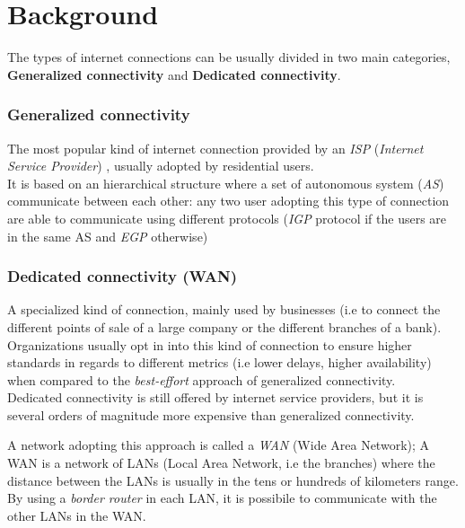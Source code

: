 \section{Background}

The types of internet connections can be usually divided in two main categories, \textbf{Generalized connectivity} and \textbf{Dedicated connectivity}.

\subsubsection{Generalized connectivity}

The most popular kind of internet connection provided by an \textit{ISP} (\textit{Internet Service Provider}) , usually adopted by residential users. \\
It is based on an hierarchical structure where a set of autonomous system (\textit{AS}) communicate between each other: any two user adopting this type of connection are able to communicate using different protocols (\textit{IGP} protocol if the users are in the same AS and  \textit{EGP} otherwise)

\subsubsection{Dedicated connectivity (WAN)}

A specialized kind of connection, mainly used by businesses (i.e to connect the different points of sale of a large company or the different branches of a bank). \\

Organizations usually opt in into this kind of connection to ensure  higher standards in regards to different metrics (i.e lower delays, higher availability) when compared to the \textit{best-effort} approach of generalized connectivity. \\

Dedicated connectivity is still offered by internet service providers, but it is several orders of magnitude more expensive than generalized connectivity.

A network adopting this approach is called a \textit{WAN} (Wide Area Network);
A WAN is a network of LANs (Local Area Network, i.e the branches) where the distance between the LANs is usually in the tens or hundreds of kilometers range. \\
By using a \textit{border router} in each LAN, it is possibile to communicate with the other LANs in the WAN.

